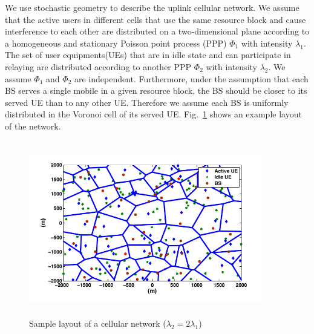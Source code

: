 \par We use stochastic geometry to
describe the uplink cellular network. We
assume that the active users in different cells that use the same resource block and cause interference to each other are distributed on a two-dimensional plane according to a homogeneous and stationary Poisson point process (PPP)
$\Phi_1$ with intensity $\lambda_1$. The set of user equipments(UEs) that are in idle state and can participate in relaying are distributed according to another PPP $\Phi_2$ with intensity $\lambda_2$. We assume $\Phi_1$ and $\Phi_2$ are independent. Furthermore, under the assumption that each BS serves a
single mobile in a given resource block, the BS should be closer to its served UE than to any other UE. Therefore we assume each BS is uniformly distributed in the Voronoi cell of its served UE. Fig.~\ref{fig:netLayout} shows an example layout of the network.

\begin{figure}[H]
\begin{center}
\includegraphics[height = 3in,width=4in,angle=00]{images/netLayoutPaper.png}
\caption{\small Sample layout of a cellular network ($\lambda_2 = 2\lambda_1$)}
\label{fig:netLayout}
\end{center}
\end{figure}

